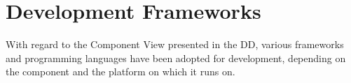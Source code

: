 \chapter{Development Frameworks}

With regard to the Component View presented in the DD, various frameworks and programming languages have been adopted for development, depending on the component and the platform on which it runs on.



